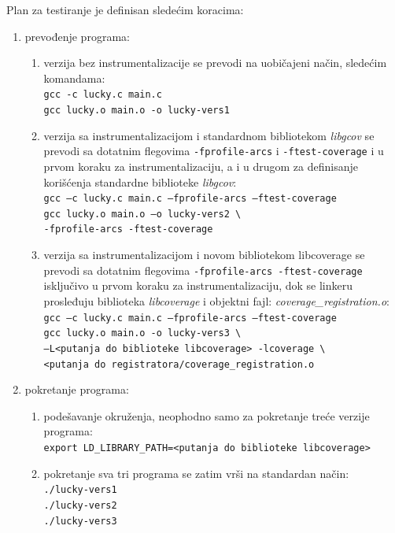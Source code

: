 \documentclass[12pt,oneside]{memoir}
\newcommand{\kod}[1]{\texttt{#1}}
\newcommand{\strano}[1]{\textit{#1}}
\begin{document}
Plan za testiranje je definisan sledećim koracima:
\begin{enumerate}

\item prevođenje programa:
\begin{enumerate}
\item verzija bez instrumentalizacije se prevodi na uobičajeni način, sledećim komandama: \\
\kod{gcc -c lucky.c main.c} \\
\kod{gcc lucky.o main.o -o lucky-vers1}
\item verzija sa instrumentalizacijom i standardnom bibliotekom \strano{libgcov} se prevodi sa dotatnim flegovima \kod{-fprofile-arcs} i \kod{-ftest-coverage} i u prvom koraku za instrumentalizaciju, a i u drugom za definisanje korišćenja standardne biblioteke \strano{libgcov}: \\
\kod{gcc –c lucky.c main.c –fprofile-arcs –ftest-coverage} \\
\kod{gcc lucky.o main.o –o lucky-vers2 \textbackslash} \\
\hspace*{6mm} \kod{-fprofile-arcs -ftest-coverage}
\item verzija sa instrumentalizacijom i novom bibliotekom libcoverage se prevodi sa dotatnim flegovima \kod{-fprofile-arcs -ftest-coverage} isključivo u prvom koraku za instrumentalizaciju, dok se linkeru prosleđuju biblioteka \strano{libcoverage} i objektni fajl: \strano{coverage\_registration.o}: \\
\kod{gcc –c lucky.c main.c –fprofile-arcs –ftest-coverage} \\
\kod{gcc lucky.o main.o -o lucky-vers3 \textbackslash} \\ \hspace*{6mm} \kod{–L<putanja do biblioteke libcoverage> -lcoverage \textbackslash} \\
\hspace*{6mm} \kod{<putanja do registratora/coverage\_registration.o}
\end{enumerate}

\item pokretanje programa:
\begin{enumerate}
\item podešavanje okruženja, neophodno samo za pokretanje treće verzije programa: \\
\kod{export LD\_LIBRARY\_PATH=<putanja do biblioteke libcoverage>}
\item pokretanje sva tri programa se zatim vrši na standardan način: \\
\kod{./lucky-vers1} \\
\kod{./lucky-vers2} \\
\kod{./lucky-vers3} \\
\end{enumerate}


\end{enumerate}
\end{document}
